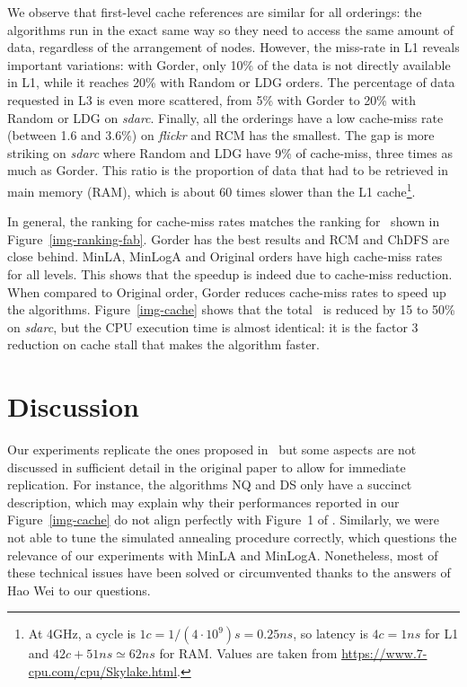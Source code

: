 We observe that first-level cache references are similar for all orderings: the algorithms run in the exact same way so they need to access the same amount of data, regardless of the arrangement of nodes. However, the miss-rate in L1 reveals important variations: with Gorder, only 10\% of the data is not directly available in L1, while it reaches 20\% with Random or LDG orders. 
%
The percentage of data requested in L3 is even more scattered, from 5\% with Gorder to 20\% with Random or LDG on \textit{sdarc}.
%
Finally, all the orderings have a low cache-miss rate (between 1.6 and 3.6\%) on \textit{flickr} and RCM has the smallest. The gap is more striking on \textit{sdarc} where Random and LDG have 9\% of cache-miss, three times as much as Gorder. This ratio is the proportion of data that had to be retrieved in main memory (RAM), which is about 60 times slower than the L1 cache\footnote{At 4GHz, a cycle is $1c=1/(4\cdot 10^9)s=0.25ns$, so latency is $4c=1ns$ for L1 and $42c+51ns\simeq 62ns$ for RAM. Values are taken from \url{https://www.7-cpu.com/cpu/Skylake.html}.}.

In general, the ranking for cache-miss rates matches the ranking for \runtime\ shown in Figure~\ref{img-ranking-fab}. Gorder has the best results and RCM and ChDFS are close behind. MinLA, MinLogA and Original orders have high cache-miss rates for all levels. This shows that the speedup is indeed due to cache-miss reduction.
%
When compared to Original order, Gorder reduces cache-miss rates to speed up the algorithms. Figure~\ref{img-cache} shows that the total \runtime\ is reduced by 15 to 50\% on \textit{sdarc}, but the CPU execution time is almost identical: it is the factor 3 reduction on cache stall that makes the algorithm faster. 






\section{Discussion}\label{discussion}

Our experiments replicate the ones proposed in~\cite{gorder} but some aspects are not discussed in sufficient detail in the original paper to allow for immediate replication.
%
For instance, the algorithms NQ and DS only have a succinct description, which may explain why their performances reported in our Figure~\ref{img-cache} do not align perfectly with Figure~1 of \cite{gorder}. 
Similarly, we were not able to tune the simulated annealing procedure correctly, which questions the relevance of our experiments with MinLA and MinLogA.
%
Nonetheless, most of these technical issues have been solved or circumvented thanks to the answers of Hao Wei to our questions.

